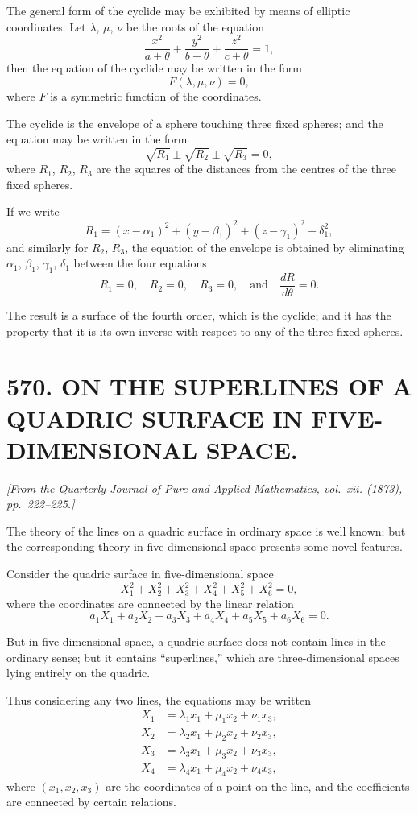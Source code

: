 \documentclass[11pt,a4paper]{article}
\theoremstyle{plain}
\theoremstyle{definition}
\theoremstyle{remark}
\newcommand{\paper}[2]{\section*{#1 #2}}
\newcommand{\papersource}[1]{\par\noindent\textit{#1}\par\medskip}
\begin{document}
The general form of the cyclide may be exhibited by means of elliptic coordinates. Let $\lambda$, $\mu$, $\nu$ be the roots of the equation
\[
\frac{x^2}{a + \theta} + \frac{y^2}{b + \theta} + \frac{z^2}{c + \theta} = 1,
\]
then the equation of the cyclide may be written in the form
\[
F(\lambda, \mu, \nu) = 0,
\]
where $F$ is a symmetric function of the coordinates.

\newpage

The cyclide is the envelope of a sphere touching three fixed spheres; and the equation may be written in the form
\[
\sqrt{R_1} \pm \sqrt{R_2} \pm \sqrt{R_3} = 0,
\]
where $R_1$, $R_2$, $R_3$ are the squares of the distances from the centres of the three fixed spheres.

If we write
\[
R_1 = (x - \alpha_1)^2 + (y - \beta_1)^2 + (z - \gamma_1)^2 - \delta_1^2,
\]
and similarly for $R_2$, $R_3$, the equation of the envelope is obtained by eliminating $\alpha_1$, $\beta_1$, $\gamma_1$, $\delta_1$ between the four equations
\[
R_1 = 0, \quad R_2 = 0, \quad R_3 = 0, \quad \text{and} \quad \frac{dR}{d\theta} = 0.
\]

The result is a surface of the fourth order, which is the cyclide; and it has the property that it is its own inverse with respect to any of the three fixed spheres.

\newpage
\paper{570.}{ON THE SUPERLINES OF A QUADRIC SURFACE IN FIVE-DIMENSIONAL SPACE.}

\papersource{[From the Quarterly Journal of Pure and Applied Mathematics, vol.~xii. (1873), pp.~222--225.]}

The theory of the lines on a quadric surface in ordinary space is well known; but the corresponding theory in five-dimensional space presents some novel features.

Consider the quadric surface in five-dimensional space
\[
X_1^2 + X_2^2 + X_3^2 + X_4^2 + X_5^2 + X_6^2 = 0,
\]
where the coordinates are connected by the linear relation
\[
a_1X_1 + a_2X_2 + a_3X_3 + a_4X_4 + a_5X_5 + a_6X_6 = 0.
\]

But in five-dimensional space, a quadric surface does not contain lines in the ordinary sense; but it contains ``superlines,'' which are three-dimensional spaces lying entirely on the quadric.

\newpage

Thus considering any two lines, the equations may be written
\begin{align*}
X_1 &= \lambda_1 x_1 + \mu_1 x_2 + \nu_1 x_3, \\
X_2 &= \lambda_2 x_1 + \mu_2 x_2 + \nu_2 x_3, \\
X_3 &= \lambda_3 x_1 + \mu_3 x_2 + \nu_3 x_3, \\
X_4 &= \lambda_4 x_1 + \mu_4 x_2 + \nu_4 x_3,
\end{align*}
where $(x_1, x_2, x_3)$ are the coordinates of a point on the line, and the coefficients are connected by certain relations.
\end{document}

